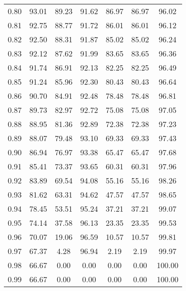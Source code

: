 \begin{tabular}{|c|c|c|c|c|c|c|}
      0.80 &     93.01 &     89.23 &      91.62 &   86.97 &      86.97 &         96.02 \\
      0.81 &     92.75 &     88.77 &      91.72 &   86.01 &      86.01 &         96.12 \\
      0.82 &     92.50 &     88.31 &      91.87 &   85.02 &      85.02 &         96.24 \\
      0.83 &     92.12 &     87.62 &      91.99 &   83.65 &      83.65 &         96.36 \\
      0.84 &     91.74 &     86.91 &      92.13 &   82.25 &      82.25 &         96.49 \\
      0.85 &     91.24 &     85.96 &      92.30 &   80.43 &      80.43 &         96.64 \\
      0.86 &     90.70 &     84.91 &      92.48 &   78.48 &      78.48 &         96.81 \\
      0.87 &     89.73 &     82.97 &      92.72 &   75.08 &      75.08 &         97.05 \\
      0.88 &     88.95 &     81.36 &      92.89 &   72.38 &      72.38 &         97.23 \\
      0.89 &     88.07 &     79.48 &      93.10 &   69.33 &      69.33 &         97.43 \\
      0.90 &     86.94 &     76.97 &      93.38 &   65.47 &      65.47 &         97.68 \\
      0.91 &     85.41 &     73.37 &      93.65 &   60.31 &      60.31 &         97.96 \\
      0.92 &     83.89 &     69.54 &      94.08 &   55.16 &      55.16 &         98.26 \\
      0.93 &     81.62 &     63.31 &      94.62 &   47.57 &      47.57 &         98.65 \\
      0.94 &     78.45 &     53.51 &      95.24 &   37.21 &      37.21 &         99.07 \\
      0.95 &     74.14 &     37.58 &      96.13 &   23.35 &      23.35 &         99.53 \\
      0.96 &     70.07 &     19.06 &      96.59 &   10.57 &      10.57 &         99.81 \\
      0.97 &     67.37 &      4.28 &      96.94 &    2.19 &       2.19 &         99.97 \\
      0.98 &     66.67 &      0.00 &       0.00 &    0.00 &       0.00 &        100.00 \\
      0.99 &     66.67 &      0.00 &       0.00 &    0.00 &       0.00 &        100.00 \\
\bottomrule
\end{tabular}
